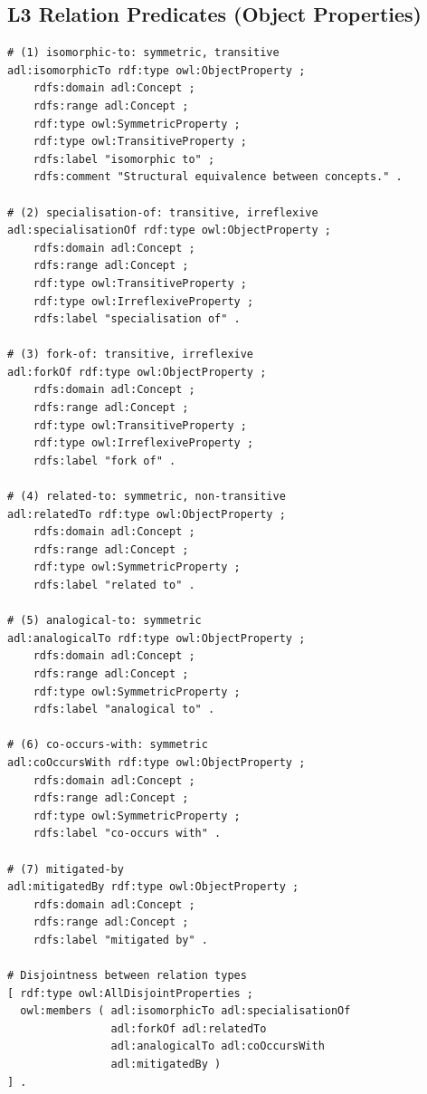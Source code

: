 \subsection{L3 Relation Predicates (Object Properties)}

\begin{lstlisting}[language=turtle, caption={L3 relation predicates with formal properties.}, label={lst:owl-dl-l3}]
# (1) isomorphic-to: symmetric, transitive
adl:isomorphicTo rdf:type owl:ObjectProperty ;
    rdfs:domain adl:Concept ;
    rdfs:range adl:Concept ;
    rdf:type owl:SymmetricProperty ;
    rdf:type owl:TransitiveProperty ;
    rdfs:label "isomorphic to" ;
    rdfs:comment "Structural equivalence between concepts." .

# (2) specialisation-of: transitive, irreflexive
adl:specialisationOf rdf:type owl:ObjectProperty ;
    rdfs:domain adl:Concept ;
    rdfs:range adl:Concept ;
    rdf:type owl:TransitiveProperty ;
    rdf:type owl:IrreflexiveProperty ;
    rdfs:label "specialisation of" .

# (3) fork-of: transitive, irreflexive
adl:forkOf rdf:type owl:ObjectProperty ;
    rdfs:domain adl:Concept ;
    rdfs:range adl:Concept ;
    rdf:type owl:TransitiveProperty ;
    rdf:type owl:IrreflexiveProperty ;
    rdfs:label "fork of" .

# (4) related-to: symmetric, non-transitive
adl:relatedTo rdf:type owl:ObjectProperty ;
    rdfs:domain adl:Concept ;
    rdfs:range adl:Concept ;
    rdf:type owl:SymmetricProperty ;
    rdfs:label "related to" .

# (5) analogical-to: symmetric
adl:analogicalTo rdf:type owl:ObjectProperty ;
    rdfs:domain adl:Concept ;
    rdfs:range adl:Concept ;
    rdf:type owl:SymmetricProperty ;
    rdfs:label "analogical to" .

# (6) co-occurs-with: symmetric
adl:coOccursWith rdf:type owl:ObjectProperty ;
    rdfs:domain adl:Concept ;
    rdfs:range adl:Concept ;
    rdf:type owl:SymmetricProperty ;
    rdfs:label "co-occurs with" .

# (7) mitigated-by
adl:mitigatedBy rdf:type owl:ObjectProperty ;
    rdfs:domain adl:Concept ;
    rdfs:range adl:Concept ;
    rdfs:label "mitigated by" .

# Disjointness between relation types
[ rdf:type owl:AllDisjointProperties ;
  owl:members ( adl:isomorphicTo adl:specialisationOf
                adl:forkOf adl:relatedTo
                adl:analogicalTo adl:coOccursWith
                adl:mitigatedBy )
] .
\end{lstlisting}

